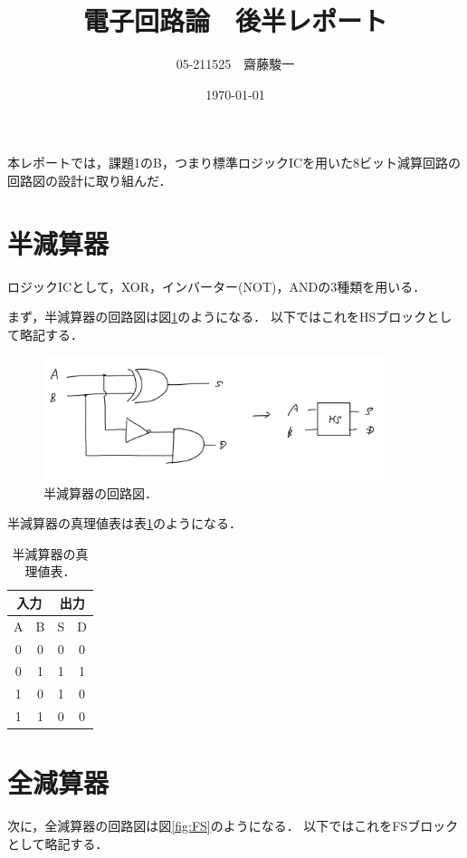 \documentclass[a4paper,11pt]{jsarticle}
\begin{document}
\title{電子回路論　後半レポート}
\author{05-211525　齋藤駿一}
\date{\today}
\maketitle

本レポートでは，課題1のB，つまり標準ロジックICを用いた8ビット減算回路の回路図の設計に取り組んだ．

\section{半減算器}
ロジックICとして，XOR，インバーター(NOT)，ANDの3種類を用いる．

まず，半減算器の回路図は図\ref{fig:HS}のようになる．
以下ではこれをHSブロックとして略記する．

\begin{figure}[htbp]
  \centering
  \includegraphics[width=10cm]{HS.jpg}
  \caption{半減算器の回路図．}
  \label{fig:HS}
\end{figure}

半減算器の真理値表は表\ref{tab:HS}のようになる．
\begin{table}[htbp]
  \centering
  \caption{半減算器の真理値表．}
  \label{tab:HS}
  \begin{tabular}{cc|cc}
    \hline
    \multicolumn{2}{c|}{入力} & \multicolumn{2}{c}{出力} \\
    \hline
    A & B & S & D \\
    \hline\hline
    0 & 0 & 0 & 0 \\
    0 & 1 & 1 & 1 \\
    1 & 0 & 1 & 0 \\
    1 & 1 & 0 & 0 \\
    \hline
  \end{tabular}
\end{table}

\section{全減算器}
次に，全減算器の回路図は図\ref{fig:FS}のようになる．
以下ではこれをFSブロックとして略記する．
\end{document}
